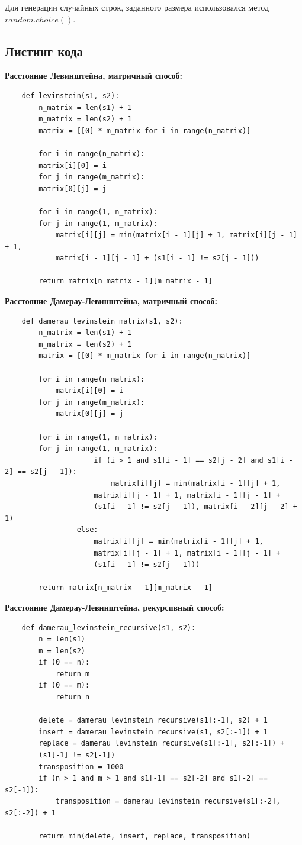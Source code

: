 \documentclass[a4paper,14pt]{article} %
\begin{document}
        Для генерации случайных строк, заданного размера использовался метод $random.choice()$. 
        \hfill
        
        \subsection{Листинг кода}
        \textbf{Расстояние Левинштейна, матричный способ: }
        
	\begin{lstlisting}
	def levinstein(s1, s2):
 	    n_matrix = len(s1) + 1
 	    m_matrix = len(s2) + 1
 	    matrix = [[0] * m_matrix for i in range(n_matrix)]

 	    for i in range(n_matrix):
  	 	matrix[i][0] = i
 	    for j in range(m_matrix):
 		matrix[0][j] = j

 	    for i in range(1, n_matrix):
   		for j in range(1, m_matrix):
   		    matrix[i][j] = min(matrix[i - 1][j] + 1, matrix[i][j - 1] + 1,
   	   	    matrix[i - 1][j - 1] + (s1[i - 1] != s2[j - 1]))
 
 	    return matrix[n_matrix - 1][m_matrix - 1]
	\end{lstlisting}

	\textbf{Расстояние Дамерау-Левинштейна, матричный способ: }
	\begin{lstlisting}
	def damerau_levinstein_matrix(s1, s2):
	    n_matrix = len(s1) + 1
	    m_matrix = len(s2) + 1
   	    matrix = [[0] * m_matrix for i in range(n_matrix)]

 	    for i in range(n_matrix):
  	        matrix[i][0] = i
 	    for j in range(m_matrix):
  	        matrix[0][j] = j

 	    for i in range(1, n_matrix):
   		for j in range(1, m_matrix):
    	             if (i > 1 and s1[i - 1] == s2[j - 2] and s1[i - 2] == s2[j - 1]):
     	                 matrix[i][j] = min(matrix[i - 1][j] + 1, 
	                 matrix[i][j - 1] + 1, matrix[i - 1][j - 1] + 
	                 (s1[i - 1] != s2[j - 1]), matrix[i - 2][j - 2] + 1)
   	             else:
   	                 matrix[i][j] = min(matrix[i - 1][j] + 1, 
	                 matrix[i][j - 1] + 1, matrix[i - 1][j - 1] + 
	                 (s1[i - 1] != s2[j - 1]))

 	    return matrix[n_matrix - 1][m_matrix - 1]
	\end{lstlisting}

	\textbf{Расстояние Дамерау-Левинштейна, рекурсивный способ: }
	\begin{lstlisting}
	def damerau_levinstein_recursive(s1, s2):
	    n = len(s1)
	    m = len(s2)
	    if (0 == n):
  	        return m
	    if (0 == m):
  	        return n

	    delete = damerau_levinstein_recursive(s1[:-1], s2) + 1
	    insert = damerau_levinstein_recursive(s1, s2[:-1]) + 1
	    replace = damerau_levinstein_recursive(s1[:-1], s2[:-1]) + 
	    (s1[-1] != s2[-1])
	    transposition = 1000
	    if (n > 1 and m > 1 and s1[-1] == s2[-2] and s1[-2] == s2[-1]):
  	        transposition = damerau_levinstein_recursive(s1[:-2], s2[:-2]) + 1

	    return min(delete, insert, replace, transposition)
	\end{lstlisting}
\end{document}

